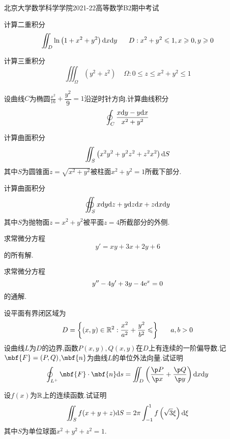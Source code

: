 \documentclass{ctexart}
\begin{document}
\pagestyle{empty}
\begin{center}\Large
    北京大学数学科学学院2021-22高等数学B2期中考试
\end{center}
\begin{problem}[1.(10\songti{分})]
    计算二重积分
    \[\iint_{D}\ln\left(1+x^2+y^2\right)\dx\di y\ \ \ \ \ D:x^2+y^2\leqslant1,x\geqslant0,y\geqslant0\]
\end{problem}
\begin{problem}[2.(10\songti{分})]
    计算三重积分
    \[\iiint_{\Omega}\left(y^2+z^2\right)\ \ \ \ \ \Omega:0\leqslant z\leqslant x^2+y^2\leqslant1\]
\end{problem}
\begin{problem}[3.(10\songti{分})]
    设曲线$C$为椭圆$\frac{x^2}{16}+\dfrac{y^2}{9}=1$沿逆时针方向.计算曲线积分
    \[\oint_{C}\dfrac{x\mathrm{d} y-y\mathrm{d} x}{x^2+y^2}\]
\end{problem}
\begin{problem}[4.(10\songti{分})]
    计算曲面积分
    \[\iint_{S}\left(x^2y^2+y^2z^2+z^2x^2\right)\mathrm{d} S\]
    其中$S$为圆锥面$z=\sqrt{x^2+y^2}$被柱面$x^2+y^2=1$所截下部分.
\end{problem}
\begin{problem}[5.(15\songti{分})]
    计算曲面积分
    \[\oiint_Sx\mathrm{d} y\mathrm{d} z+y\mathrm{d} z\mathrm{d} x+z\mathrm{d} x\mathrm{d} y\]
    其中$S$为抛物面$z=x^2+y^2$被平面$z=4$所截部分的外侧.
\end{problem}
\begin{problem}[6.(10\songti{分})]
    求常微分方程
    \[y'=xy+3x+2y+6\]
    的所有解.
\end{problem}\begin{problem}[7.(15\songti{分})]
    求常微分方程
    \[y''-4y'+3y-4\mathrm{e}^x=0\]
    的通解.
\end{problem}\begin{problem}[8.(10\songti{分})]
    设平面有界闭区域为
    \[D=\left\{(x,y)\in\R^2:\dfrac{x^2}{a^2}+\dfrac{y^2}{b^2}\leqslant\right\}\ \ \ \ \ a,b>0\]
    设曲线$L$为$D$的边界,函数$P(x,y),Q(x,y)$在$D$上有连续的一阶偏导数.记$\mbf{F}=(P,Q)$,$\mbf{n}$为曲线$L$的单位外法向量.试证明
    \[\oint_{L^+}\mbf{F}\cdot\mbf{n}\di s=\iint_{D}\left(\dfrac{\p P}{\p x}+\dfrac{\p Q}{\p y}\right)\di x\di y\]
\end{problem}\begin{problem}[9.(10\songti{分})]
    设$f(x)$为$\mathbb{R}$上的连续函数.试证明
    \[\iint_{S}f(x+y+z)\mathrm{d} S=2\pi\int_{-1}^{1}f\left(\sqrt{3}\xi\right)\mathrm{d}\xi\]
    其中$S$为单位球面$x^2+y^2+z^2=1$.
\end{problem}
\end{document}
